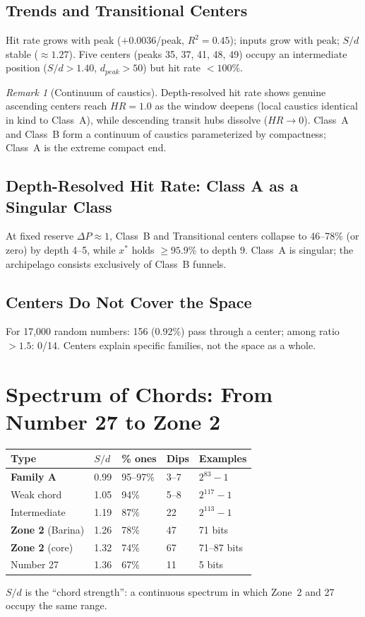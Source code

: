 \documentclass[12pt,a4paper]{article}
\theoremstyle{remark}
\newtheorem{remark}[theorem]{Remark}
\begin{document}
\subsection{Trends and Transitional Centers}
Hit rate grows with peak ($+0.0036$/peak, $R^2=0.45$); inputs grow with peak; $S/d$ stable ($\approx1.27$). Five centers (peaks 35, 37, 41, 48, 49) occupy an intermediate position ($S/d>1.40$, $d_{peak}>50$) but hit rate $<100\%$.
\begin{remark}[Continuum of caustics]
Depth-resolved hit rate shows genuine ascending centers reach $HR=1.0$ as the window deepens (local caustics identical in kind to Class~A), while descending transit hubs dissolve ($HR\to0$). Class~A and Class~B form a continuum of caustics parameterized by compactness; Class~A is the extreme compact end.
\end{remark}
\subsection{Depth-Resolved Hit Rate: Class A as a Singular Class}
At fixed reserve $\Delta P\approx1$, Class~B and Transitional centers collapse to 46--78\% (or zero) by depth 4--5, while $x^*$ holds $\ge95.9\%$ to depth 9. Class~A is singular; the archipelago consists exclusively of Class~B funnels.
\subsection{Centers Do Not Cover the Space}
For 17,000 random numbers: 156 (0.92\%) pass through a center; among ratio $>1.5$: 0/14. Centers explain specific families, not the space as a whole.

\section{Spectrum of Chords: From Number 27 to Zone 2}
\begin{table}[h]
\centering
\begin{tabular}{lllll}
\toprule
\textbf{Type} & $S/d$ & \textbf{\% ones} & \textbf{Dips} & \textbf{Examples} \\
\midrule
\textbf{Family A} & 0.99 & 95--97\% & 3--7 & $2^{83}-1$ \\
Weak chord & 1.05 & 94\% & 5--8 & $2^{117}-1$ \\
Intermediate & 1.19 & 87\% & 22 & $2^{113}-1$ \\
\textbf{Zone 2} (Barina) & 1.26 & 78\% & 47 & 71 bits \\
\textbf{Zone 2} (core) & 1.32 & 74\% & 67 & 71--87 bits \\
Number 27 & 1.36 & 67\% & 11 & 5 bits \\
\bottomrule
\end{tabular}
\end{table}
$S/d$ is the ``chord strength'': a continuous spectrum in which Zone~2 and 27 occupy the same range.
\end{document}
